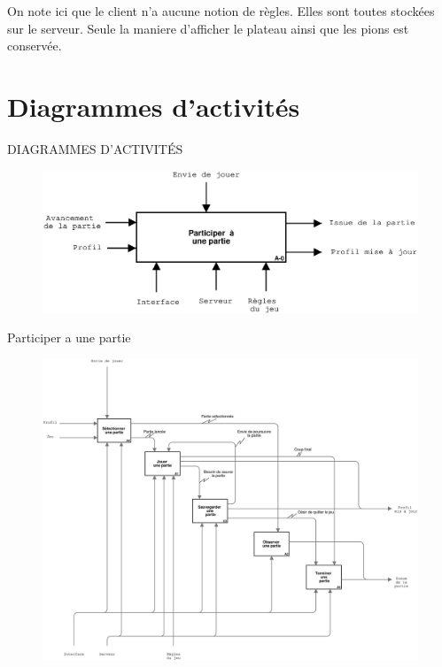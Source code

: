 \documentclass[french,12pt]{report}
\begin{document}
On note ici que le client n'a aucune notion de r\`egles. Elles sont toutes
stock\'ees sur le serveur. Seule la maniere d'afficher le plateau
ainsi que les pions est conserv\'ee.

\pagebreak

\section*{Diagrammes d'activit\'es}
{\uppercase{Diagrammes d'activit\'es}}

\begin{center}
\begin{figure}[h]
\includegraphics[width=16cm]{A-0.eps}
\end{figure}

Participer a une partie

\pagebreak

\begin{figure}[h]
\includegraphics[width=16cm]{A0.eps}
\end{figure}


\end{center}
\end{document}
